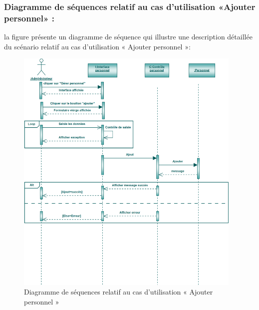 \documentclass[12 pt ]{report}
\begin{document}
\subsubsection{Diagramme de séquences relatif au cas d’utilisation «Ajouter personnel» :}
la figure   présente un diagramme de séquence qui illustre une description détaillée du scénario relatif au cas d’utilisation «  Ajouter personnel »: 
{\begin{figure}[h]
 \begin{center}
\includegraphics[width= 14 cm ,height=  12cm]{sap.PNG}
\caption{Diagramme de séquences relatif au cas d’utilisation « Ajouter personnel  »}

\end{center}
\end{figure}}
\newpage
\end{document}
